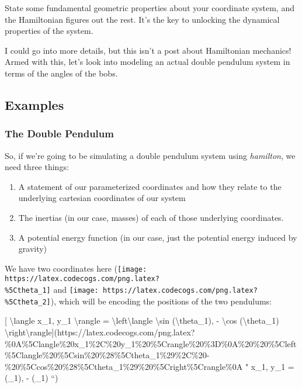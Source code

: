 \documentclass[]{article}
\begin{document}
State some fundamental geometric properties about your coordinate system, and
the Hamiltonian figures out the rest. It's the key to unlocking the dynamical
properties of the system.

I could go into more details, but this isn't a post about Hamiltonian mechanics!
Armed with this, let's look into modeling an actual double pendulum system in
terms of the angles of the bobs.

\hypertarget{examples}{%
\subsection{Examples}\label{examples}}

\hypertarget{the-double-pendulum}{%
\subsubsection{The Double Pendulum}\label{the-double-pendulum}}

So, if we're going to be simulating a double pendulum system using
\emph{hamilton}, we need three things:

\begin{enumerate}
\def\labelenumi{\arabic{enumi}.}
\item
  A statement of our parameterized coordinates and how they relate to the
  underlying cartesian coordinates of our system
\item
  The inertias (in our case, masses) of each of those underlying coordinates.
\item
  A potential energy function (in our case, just the potential energy induced by
  gravity)
\end{enumerate}

We have two coordinates here
(\texttt{[image: https://latex.codecogs.com/png.latex?\\\%5Ctheta\_1]} and
\texttt{[image: https://latex.codecogs.com/png.latex?\\\%5Ctheta\_2]}), which will
be encoding the positions of the two pendulums:

{[} \textbackslash{}langle x\_1, y\_1 \textbackslash{}rangle =
\textbackslash{}left\textbackslash{}langle \textbackslash{}sin
(\textbackslash{}theta\_1), - \textbackslash{}cos (\textbackslash{}theta\_1)
\textbackslash{}right\textbackslash{}rangle{]}(https://latex.codecogs.com/png.latex?\%0A\%5Clangle\%20x\_1\%2C\%20y\_1\%20\%5Crangle\%20\%3D\%0A\%20\%20\%5Cleft\%5Clangle\%20\%5Csin\%20\%28\%5Ctheta\_1\%29\%2C\%20-\%20\%5Ccos\%20\%28\%5Ctheta\_1\%29\%20\%5Cright\%5Crangle\%0A
" \langle x\_1, y\_1 \rangle = \left\langle \sin (\theta\_1), - \cos (\theta\_1)
\right\rangle ``)
\end{document}
